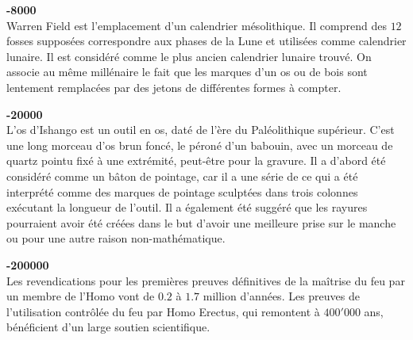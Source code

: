 \textbf{-8000}\\
Warren Field est l'emplacement d'un calendrier mésolithique. Il comprend des $12$ fosses supposées correspondre aux phases de la Lune et utilisées comme calendrier lunaire. Il est considéré comme le plus ancien calendrier lunaire trouvé. On associe au même  millénaire le fait que les marques d'un os ou de bois sont lentement remplacées par des jetons de différentes formes à compter.

\textbf{-20000}\\
L'os d'Ishango est un outil en os, daté de l'ère du Paléolithique supérieur. C'est une long morceau d'os brun foncé, le péroné d'un babouin, avec un morceau de quartz pointu fixé à une extrémité, peut-être pour la gravure. Il a d'abord été considéré comme un bâton de pointage, car il a une série de ce qui a été interprété comme des marques de pointage sculptées dans trois colonnes exécutant la longueur de l'outil. Il a également été suggéré que les rayures pourraient avoir été créées dans le but d'avoir une meilleure prise sur le manche ou pour une autre raison non-mathématique.

\textbf{-200000}\\
Les revendications pour les premières preuves définitives de la maîtrise du feu par un membre de l'Homo vont de $0.2$ à $1.7$ million d'années. Les preuves de l'utilisation contrôlée du feu par Homo Erectus, qui remontent à $400'000$ ans, bénéficient d'un large soutien scientifique.